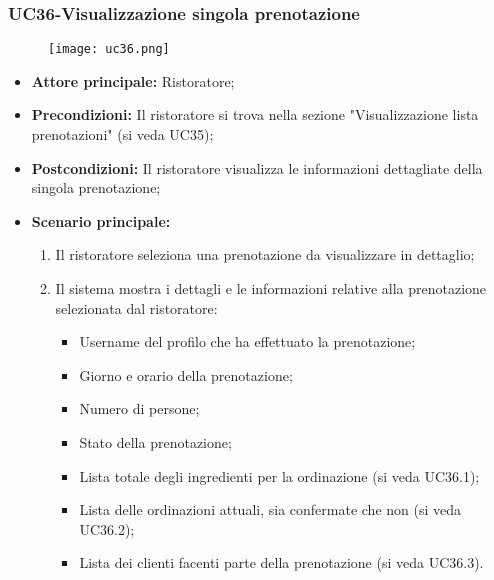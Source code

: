 \subsubsection{UC36-Visualizzazione singola prenotazione}
\begin{figure}[h] \texttt{[image: uc36.png]} \end{figure}
\begin{itemize}
    \item \textbf{Attore principale:} Ristoratore;
    \item \textbf{Precondizioni:} Il ristoratore si trova nella sezione "Visualizzazione lista prenotazioni" (si veda UC35);
    \item \textbf{Postcondizioni:} Il ristoratore visualizza le informazioni dettagliate della singola prenotazione;
    \item \textbf{Scenario principale:}
    \begin{enumerate}
        \item Il ristoratore seleziona una prenotazione da visualizzare in dettaglio;
        \item Il sistema mostra i dettagli e le informazioni relative alla prenotazione selezionata dal ristoratore:
        \begin{itemize}
            \item Username del profilo che ha effettuato la prenotazione;
            \item Giorno e orario della prenotazione;
            \item Numero di persone;
            \item Stato della prenotazione;
            \item Lista totale degli ingredienti per la ordinazione (si veda UC36.1);
            \item Lista delle ordinazioni attuali, sia confermate che non (si veda UC36.2);
            \item Lista dei clienti facenti parte della prenotazione (si veda UC36.3).
        \end{itemize}
    \end{enumerate}
\end{itemize}

